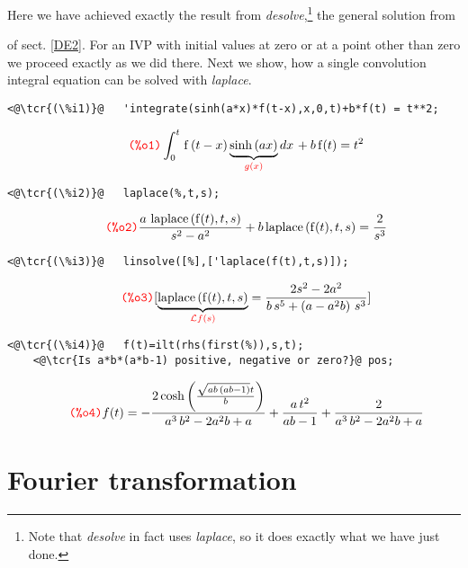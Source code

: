\documentclass[../Maxima_Workbook.tex]{subfiles}
\begin{document}
\lz Here we have achieved exactly the result from \emph{desolve},\footnote{Note that \emph{desolve} in fact uses \emph{laplace}, so it does exactly what we have just done.} the general solution from \begin{small}\end{small} of sect. \ref{DE2}. For an IVP with initial values at zero or at a point other than zero we proceed exactly as we did there. Next we show, how a single convolution integral equation can be solved with \emph{laplace}.

\lz \begin{small}
\color{blue} \leqn
\begin{lstlisting}
<@\tcr{(\%i1)}@   'integrate(sinh(a*x)*f(t-x),x,0,t)+b*f(t) = t**2;
\end{lstlisting}
\vspace{-5mm} \[\tag*{\tcr{\ttfamily (\%o1)}} \int_{0}^{t}{\left. \operatorname{f}\left( t-x\right)  \underbrace{\operatorname{sinh}\left( a x\right)}_{\tcr{g(x)}} dx\right.}+b \operatorname{f}(t)={{t}^{2}} \]
\vspace{-6mm} \begin{lstlisting}
<@\tcr{(\%i2)}@   laplace(%,t,s);
\end{lstlisting}
\vspace{-5mm} \[\tag*{\tcr{\ttfamily (\%o2)}} \frac{a \, \operatorname{laplace}\left( \operatorname{f}(t),t,s\right) }{{{s}^{2}}-{{a}^{2}}}+b \operatorname{laplace}\left( \operatorname{f}(t),t,s\right) =\frac{2}{{{s}^{3}}} \]
\vspace{-6mm} \begin{lstlisting}
<@\tcr{(\%i3)}@   linsolve([%],['laplace(f(t),t,s)]);
\end{lstlisting}
\vspace{-5mm} \[\tag*{\tcr{\ttfamily (\%o3)}} [\underbrace{\operatorname{laplace}\left( \operatorname{f}(t),t,s\right)}_{\tcr{\mc{L}f(s)}} =\frac{2 {{s}^{2}}-2 {{a}^{2}}}{b\, {{s}^{5}}+\left( a-{{a}^{2}} b\right) \, {{s}^{3}}}] \]
\vspace{-6mm} \begin{lstlisting}
<@\tcr{(\%i4)}@   f(t)=ilt(rhs(first(%)),s,t);
	<@\tcr{Is a*b*(a*b-1) positive, negative or zero?}@ pos;
\end{lstlisting}
\vspace{-4mm} \[\tag*{\tcr{\ttfamily (\%o4)}} f(t)= -\frac{2 \cosh{\left( \frac{\sqrt{a b\, \left( a b-1\right) } t}{b}\right) }}{{{a}^{3}}\, {{b}^{2}}-2 {{a}^{2}} b+a}+\frac{a\, {{t}^{2}}}{a b-1}+\frac{2}{{{a}^{3}}\, {{b}^{2}}-2 {{a}^{2}} b+a} \]
\color{black} \reqn
\end{small} \vspace{-4mm}

\section{Fourier transformation}
\end{document}
